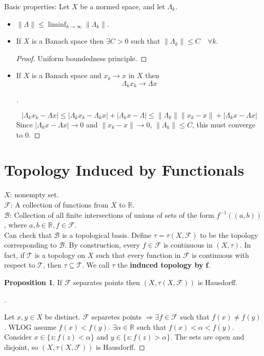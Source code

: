 \documentclass{article}
\theoremstyle{definition}
\newtheorem{prop}{Proposition}
\newenvironment{proofs}[1][\proofname]{%
  \begin{proof}[#1]$ $\par\nobreak\ignorespaces
}{%
  \end{proof}
}
\newcommand{\B}{\mathcal B}
\newcommand{\F}{\mathcal F}
\newcommand{\RR}{\mathbb R}
\newcommand{\T}{\mathcal T}
\newcommand{\Ra}{\Rightarrow}
\begin{document}
Basic properties:
Let $X$ be a normed space, and let $\Lambda_k$. 
\begin{itemize}
	\item $\|\Lambda\| \leq \liminf_{k \to \infty} \|\Lambda_k\|$.
		
	\item If $X$ is a Banach space then $\exists C > 0$ such that $\|\Lambda_k\| \leq C \quad \forall k$.
		\begin{proof}
			Uniform boundedness principle.
		\end{proof}

	\item If $X$ is a Banach space and $x_k \to x$ in $X$ then 
		\[
			\Lambda_k x_k \to \Lambda x
		\]

		\begin{proofs}
			\[
				|\Lambda_k x_k - \Lambda x| \leq |\Lambda_k x_k - \Lambda_k x| + |\Lambda_k x - \Lambda| \leq \|\Lambda_k\|\|x_k - x\| + |\Lambda_k x - \Lambda x|
			\]
			Since $|\Lambda_k x - \Lambda x| \to 0$ and $\|x_k - x\| \to 0$, $\|\Lambda_k\| \leq C$, this must converge to 0.

		\end{proofs}
\end{itemize}

\section{Topology Induced by Functionals}
\noindent $X$: nonempty set.\\
$\F$: A collection of functions from $X$ to $\RR$.\\
$\B$: Collection of all finite intersections of unions of sets of the form $f^{-1}((a, b))$, where $a, b \in \RR, f \in \F$.\\
Can check that $\B$ is a topological basis.
Define $\tau = \tau(X, \F)$ to be the topology corresponding to $\B$.
By construction, every $f \in \F$ is continuous in $(X, \tau)$.
In fact, if $\T$ is a topology on $X$ such that every function in $\F$ is continuous with respect to $\T$, then $\tau \subseteq \T$.
We call $\tau$ the \textbf{induced topology by} $\bm{f}$.

\begin{prop}
	If $\F$ separates points then $(X, \tau(X, \F))$ is Hausdorff.
\end{prop}

\begin{proofs}
	Let $x, y \in X$ be distinct.
	$\F$ separetes points $\Ra \exists f \in \F$ such that $f(x) \neq f(y)$.
	WLOG assume $f(x) < f(y)$.
	$\exists \alpha \in \RR$ such that $f(x) < \alpha < f(y)$.
	Consider $x \in \{ z: f(z) < \alpha\}$ and $y \in \{z: f(z) > \alpha\}$.
	The sets are open and disjoint, so $(X, \tau(X, \F))$ is Hausdorff.
\end{proofs}
\end{document}
